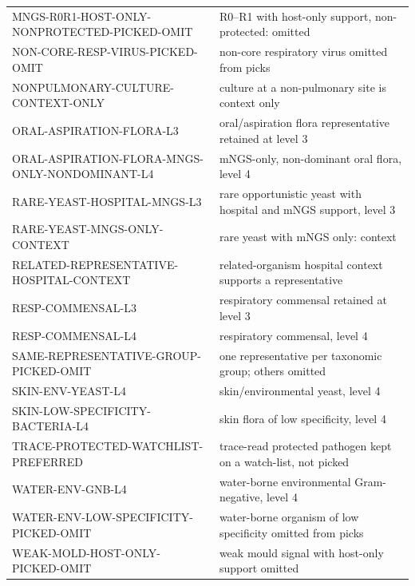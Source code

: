 \documentclass[11pt,a4paper]{article}
\newcommand{\mngs}{mNGS\xspace}
\begin{document}
\begin{table}[h]
\begin{tabular}{p{7.0cm}p{8.0cm}}
MNGS-R0R1-HOST-ONLY-NONPROTECTED-PICKED-OMIT & R0--R1 with host-only support, non-protected: omitted \\
NON-CORE-RESP-VIRUS-PICKED-OMIT & non-core respiratory virus omitted from picks \\
NONPULMONARY-CULTURE-CONTEXT-ONLY & culture at a non-pulmonary site is context only \\
ORAL-ASPIRATION-FLORA-L3 & oral/aspiration flora representative retained at level 3 \\
ORAL-ASPIRATION-FLORA-MNGS-ONLY-NONDOMINANT-L4 & \mngs-only, non-dominant oral flora, level 4 \\
RARE-YEAST-HOSPITAL-MNGS-L3 & rare opportunistic yeast with hospital and \mngs support, level 3 \\
RARE-YEAST-MNGS-ONLY-CONTEXT & rare yeast with \mngs only: context \\
RELATED-REPRESENTATIVE-HOSPITAL-CONTEXT & related-organism hospital context supports a representative \\
RESP-COMMENSAL-L3 & respiratory commensal retained at level 3 \\
RESP-COMMENSAL-L4 & respiratory commensal, level 4 \\
SAME-REPRESENTATIVE-GROUP-PICKED-OMIT & one representative per taxonomic group; others omitted \\
SKIN-ENV-YEAST-L4 & skin/environmental yeast, level 4 \\
SKIN-LOW-SPECIFICITY-BACTERIA-L4 & skin flora of low specificity, level 4 \\
TRACE-PROTECTED-WATCHLIST-PREFERRED & trace-read protected pathogen kept on a watch-list, not picked \\
WATER-ENV-GNB-L4 & water-borne environmental Gram-negative, level 4 \\
WATER-ENV-LOW-SPECIFICITY-PICKED-OMIT & water-borne organism of low specificity omitted from picks \\
WEAK-MOLD-HOST-ONLY-PICKED-OMIT & weak mould signal with host-only support omitted \\
\bottomrule
\end{tabular}
\end{table}
\end{document}
